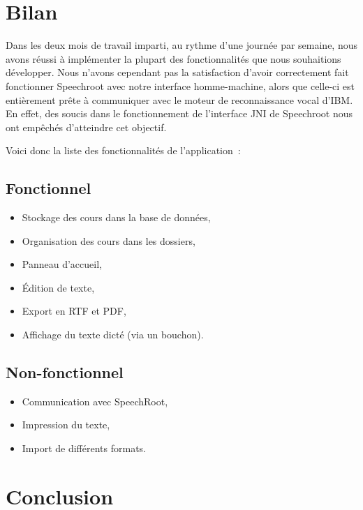 \documentclass[a4paper,11pt]{report}
\begin{document}







\chapter{Bilan}

Dans les deux mois de travail imparti, au rythme d'une journée par semaine, nous avons réussi à implémenter la plupart des fonctionnalités que nous souhaitions développer. 
Nous n'avons cependant pas la satisfaction d'avoir correctement fait fonctionner Speechroot avec notre interface homme-machine, alors que celle-ci est entièrement prête à communiquer avec le moteur de reconnaissance vocal d'IBM.
En effet, des soucis dans le fonctionnement de l'interface JNI de Speechroot nous ont empêchés d'atteindre cet objectif.

Voici donc la liste des fonctionnalités de l'application~:

\section{Fonctionnel}
\begin{itemize}
	\item Stockage des cours dans la base de données,
	\item Organisation des cours dans les dossiers,
	\item Panneau d'accueil,
	\item Édition de texte,
	\item Export en RTF et PDF,
	\item Affichage du texte dicté (via un bouchon).
\end{itemize}

\section{Non-fonctionnel}
\begin{itemize}
	\item Communication avec SpeechRoot,
	\item Impression du texte,
	\item Import de différents formats.	
\end{itemize}


\chapter{Conclusion}
\end{document}
